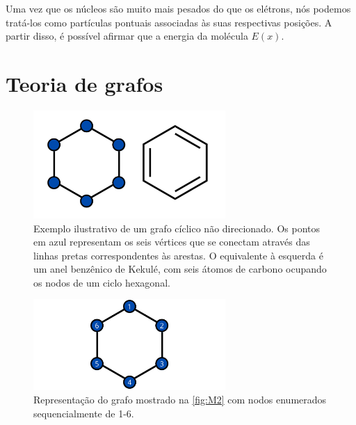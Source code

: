 Uma vez que os núcleos são muito mais pesados do que os elétrons, nós podemos tratá-los como partículas pontuais associadas às suas respectivas posições. A partir disso, é possível afirmar que a energia da molécula $E(x)$.

\section{Teoria de grafos}

\begin{figure}[htb]
	\caption{\label{fig:M2} Exemplo ilustrativo de um grafo cíclico não direcionado. Os pontos em azul representam os seis vértices que se conectam através das linhas pretas correspondentes às arestas. O equivalente à esquerda é um anel benzênico de Kekulé, com seis átomos de carbono ocupando os nodos de um ciclo hexagonal.}
	\begin{center}
		\includegraphics[width=0.65\textwidth]{images/grafo(2).png}
	\end{center}
\end{figure}

\begin{figure}[htb]
\caption{\label{fig:graphEnumerated}Representação do grafo mostrado na \autoref{fig:M2} com nodos enumerados sequencialmente de 1-6.}
	\begin{center}
		\includegraphics[width=0.65\textwidth]{images/graphEnumerated.png}
	\end{center}
\end{figure}

